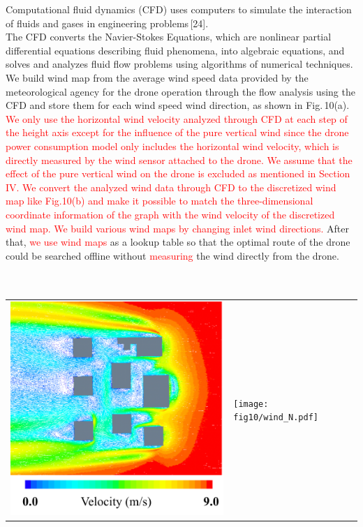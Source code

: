 \documentclass[onecolumn]{IEEEconf}
\begin{document}
\begin{description}
\begin{mdframed}[ linewidth=.75pt, userdefinedwidth=0.9\textwidth]
{    Computational fluid dynamics (CFD) uses computers to simulate the interaction of fluids and gases in engineering problems\,[24].~\\
    The CFD converts the Navier-Stokes Equations, which are nonlinear partial differential equations describing fluid phenomena, into algebraic equations, and solves and analyzes fluid flow problems using algorithms of numerical techniques.
    We build wind map from the average wind speed data provided by the meteorological agency for the drone operation through the flow analysis using the CFD and store them for each wind speed wind direction, as shown in Fig.\,10(a).}
    ~\\
    \textcolor{red}{
    We only use the horizontal wind velocity analyzed through CFD at each step of the height axis except for the influence of the pure vertical wind since the drone power consumption model only includes the horizontal wind velocity, which is directly measured by the wind sensor attached to the drone. 
    We assume that the effect of the pure vertical wind on the drone is excluded as mentioned in Section IV.
    We convert the analyzed wind data through CFD to the discretized wind map like Fig.10(b) and make it possible to match the three-dimensional coordinate information of the graph with the wind velocity of the discretized wind map.
    We build various wind maps by changing inlet wind directions.}
    After that, \textcolor{red}{we use wind maps} as a lookup table so that the optimal route of the drone could be searched offline without \textcolor{red}{measuring} the wind directly from the drone.
    \\~\\
    ~\par
    \centering
    \setcounter{figure}{9}
    \begin{tabular}{m{}m{}}
        \includegraphics[scale=0.59]{fig10/CFD_map.pdf} &  \texttt{[image: fig10/wind\_N.pdf]} \\

\end{tabular}
\end{mdframed}
\end{description}
\end{document}
